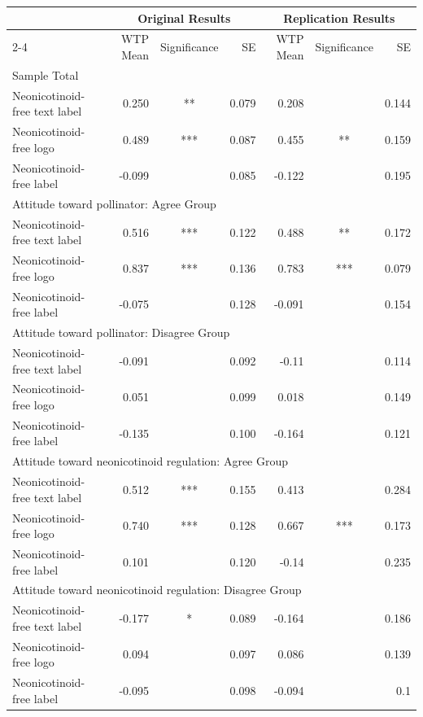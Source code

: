 \documentclass{article}
\begin{document}
\begin{center}
\renewcommand{\arraystretch}{1.15}
\begin{tabular}{l r c r r c r}
\hline
& \multicolumn{3}{c}{Original Results}
& \multicolumn{3}{c}{Replication Results} \\
\cline{2-4} \cline{5-7}
& WTP Mean & Significance & SE
& WTP Mean & Significance & SE \\
\hline

\multicolumn{7}{l}{Sample Total} \\
\hline
Neonicotinoid-free text label & 0.250 & ** & 0.079 & 0.208 & & 0.144\\
Neonicotinoid-free logo       & 0.489 & *** & 0.087 & 0.455 & ** & 0.159\\
Neonicotinoid-free label      & -0.099 & & 0.085  & -0.122 & & 0.195\\
\hline

\multicolumn{7}{l}{Attitude toward pollinator: Agree Group} \\
\hline
Neonicotinoid-free text label & 0.516 & *** & 0.122 & 0.488 & ** & 0.172\\
Neonicotinoid-free logo       & 0.837 & *** & 0.136 & 0.783 & *** & 0.079\\
Neonicotinoid-free label      & -0.075 & & 0.128 & -0.091 & & 0.154\\
\hline

\multicolumn{7}{l}{Attitude toward pollinator: Disagree Group} \\
\hline
Neonicotinoid-free text label & -0.091 & & 0.092 & -0.11 & & 0.114\\
Neonicotinoid-free logo       & 0.051 & & 0.099 & 0.018 & & 0.149\\
Neonicotinoid-free label      & -0.135& & 0.100 & -0.164 & & 0.121\\
\hline

\multicolumn{7}{l}{Attitude toward neonicotinoid regulation: Agree Group} \\
\hline
Neonicotinoid-free text label & 0.512& ***& 0.155 & 0.413 & & 0.284\\
Neonicotinoid-free logo       & 0.740& ***& 0.128 & 0.667 & *** & 0.173\\
Neonicotinoid-free label      & 0.101 & & 0.120 & -0.14 & & 0.235\\
\hline

\multicolumn{7}{l}{Attitude toward neonicotinoid regulation: Disagree Group} \\
\hline
Neonicotinoid-free text label & -0.177&* & 0.089 & -0.164 & & 0.186\\
Neonicotinoid-free logo       & 0.094& & 0.097& 0.086 & & 0.139\\
Neonicotinoid-free label      & -0.095 & & 0.098 & -0.094 & & 0.1\\
\hline


\end{tabular}
\end{center}
\end{document}

